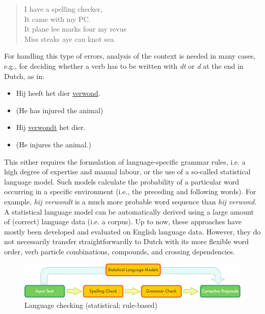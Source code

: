 \documentclass[]{../../metanetpaper}
\begin{document}
\begin{multicols}{2}
\begin{quote}
  I have a spelling checker,\\
  It came with my PC.\\
  It plane lee marks four my revue\\
  Miss steaks aye can knot sea.
\end{quote}

    For handling this type of errors, analysis of the context is needed in many cases, e.g., for deciding whether a verb has to be written with \emph{dt} or \emph{d} at the end in Dutch, as in:\\
\begin{itemize}
  \item  Hij heeft het dier \underline{verwond}.
 \item   (He has injured the animal)
 \item   Hij \underline{verwondt} het dier.
  \item  (He injures the animal.)
\end{itemize}


 This either requires the formulation of language-specific grammar rules, i.e. a high degree of expertise and manual labour, or the use of a so-called statistical language model.  Such models calculate the probability of a particular word occurring in a specific environment (i.e., the preceding and following words). For example, \emph{hij verwondt} is a much more probable word sequence than \emph{hij verwond}. A statistical language model can be automatically derived using a large amount of (correct) language data (i.e. a corpus). Up to now, these approaches have mostly been developed and evaluated on English language data. However, they do not necessarily transfer straightforwardly to Dutch with its more flexible word order, verb particle combinations, compounds, and crossing dependencies.

\begin{figure}[htb]
  \center
  \includegraphics[width=\textwidth]{../_media/english/language_checking}
  \caption{Language checking (statistical; rule-based)}
  \label{fig:langcheckingaarch_en}
\end{figure}


\end{multicols}
\end{document}

